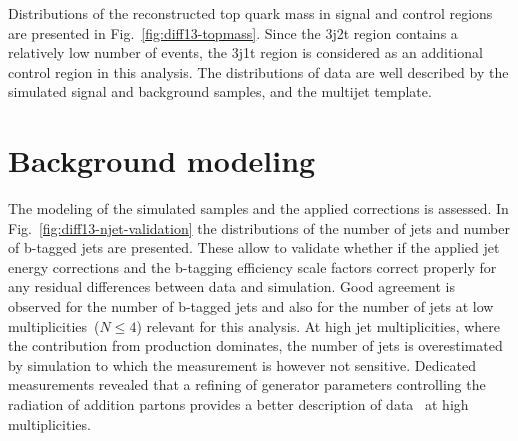 Distributions of the reconstructed top quark mass in signal and control regions are presented in Fig.~\ref{fig:diff13-topmass}. Since the 3j2t region contains a relatively low number of events, the 3j1t region is considered as an additional \ttbar control region in this analysis. The distributions of data are well described by the simulated signal and background samples, and the multijet template.

 


\section{Background modeling}
\label{sec:diff13-modeling}

The modeling of the simulated samples and the applied corrections is assessed. In Fig.~\ref{fig:diff13-njet-validation} the distributions of the number of jets and number of b-tagged jets are presented. These allow to validate whether if the applied jet energy corrections and the b-tagging efficiency scale factors correct properly for any residual differences between data and simulation. Good agreement is observed for the number of b-tagged jets and also for the number of jets at low multiplicities~($N\leq4$) relevant for this analysis. At high jet multiplicities, where the contribution from \ttbar production dominates, the number of jets is overestimated by simulation to which the measurement is however not sensitive. Dedicated \ttbar measurements revealed that a refining of generator parameters controlling the radiation of addition partons provides a better description of data~\cite{CMS-PAS-TOP-16-021} at high multiplicities.


